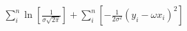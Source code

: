 \documentclass[preview]{standalone}
\begin{document}
\begin{align*}
\sum_i^n \ln [ \frac{1}{\sigma \sqrt{2 \pi}} ] + \sum_i^n [ -\frac{1}{2\sigma^2} (y_i -\omega x_i)^2 ]
\end{align*}
\end{document}
